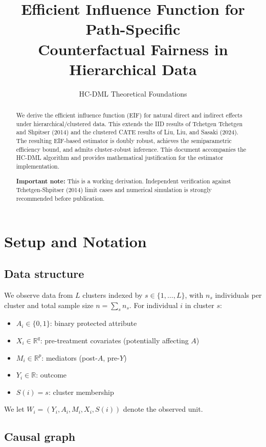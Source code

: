 \documentclass[11pt]{article}
\title{Efficient Influence Function for Path-Specific\\ Counterfactual Fairness in Hierarchical Data}
\author{HC-DML Theoretical Foundations}
\date{}
\theoremstyle{plain}
\theoremstyle{definition}
\theoremstyle{remark}
\newcommand{\R}{\mathbb{R}}
\begin{document}
\maketitle

\begin{abstract}
We derive the efficient influence function (EIF) for natural direct and indirect effects under hierarchical/clustered data. This extends the IID results of Tchetgen Tchetgen and Shpitser (2014) and the clustered CATE results of Liu, Liu, and Sasaki (2024). The resulting EIF-based estimator is doubly robust, achieves the semiparametric efficiency bound, and admits cluster-robust inference. This document accompanies the HC-DML algorithm and provides mathematical justification for the estimator implementation.

\textbf{Important note:} This is a working derivation. Independent verification against Tchetgen-Shpitser (2014) limit cases and numerical simulation is strongly recommended before publication.
\end{abstract}

\tableofcontents

\section{Setup and Notation}
\label{sec:setup}

\subsection{Data structure}

We observe data from $L$ clusters indexed by $s \in \{1, \dots, L\}$, with $n_s$ individuals per cluster and total sample size $n = \sum_s n_s$. For individual $i$ in cluster $s$:
\begin{itemize}[itemsep=2pt]
    \item $A_i \in \{0,1\}$: binary protected attribute
    \item $X_i \in \R^q$: pre-treatment covariates (potentially affecting $A$)
    \item $M_i \in \R^p$: mediators (post-$A$, pre-$Y$)
    \item $Y_i \in \R$: outcome
    \item $S(i) = s$: cluster membership
\end{itemize}

We let $W_i = (Y_i, A_i, M_i, X_i, S(i))$ denote the observed unit.

\subsection{Causal graph}
\end{document}
